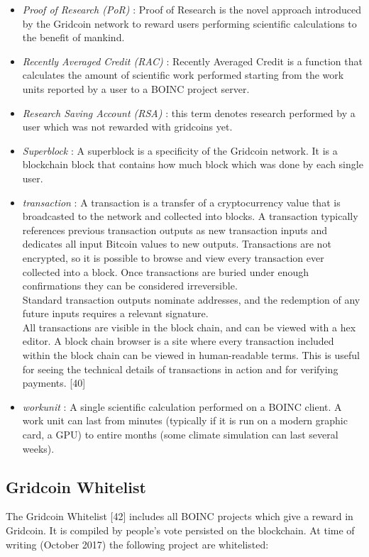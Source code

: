 \begin{itemize}
  \item \textit{Proof of Research (PoR)} : Proof of Research is the novel approach introduced by the Gridcoin network to reward users performing scientific calculations to the benefit of mankind.
  \item \textit{Recently Averaged Credit (RAC)} : Recently Averaged Credit is a function that calculates the amount of scientific work performed starting from the work units reported by a user to a BOINC project server.
  \item \textit{Research Saving Account (RSA)} : this term denotes research performed by a user which was not rewarded with gridcoins yet.
  \item \textit{Superblock} : A superblock is a specificity of the Gridcoin network. It is a blockchain block that contains how much block which was done by each single user.
  \item \textit{transaction} : A transaction is a transfer of a cryptocurrency value that is broadcasted to the network and collected into blocks. A transaction typically references previous transaction outputs as new transaction inputs and dedicates all input Bitcoin values to new outputs. Transactions are not encrypted, so it is possible to browse and view every transaction ever collected into a block. Once transactions are buried under enough confirmations they can be considered irreversible.\\
Standard transaction outputs nominate addresses, and the redemption of any future inputs requires a relevant signature.\\
All transactions are visible in the block chain, and can be viewed with a hex editor. A block chain browser is a site where every transaction included within the block chain can be viewed in human-readable terms. This is useful for seeing the technical details of transactions in action and for verifying payments. [40]
  \item \textit{workunit} : A single scientific calculation performed on a BOINC client. A work unit can last from minutes (typically if it is run on a modern graphic card, a GPU) 
to entire months (some climate simulation can last several weeks).
\end{itemize}

\subsection{Gridcoin Whitelist}

The Gridcoin Whitelist [42] includes all BOINC projects which give a reward in Gridcoin. It is compiled by people's vote persisted on the blockchain. At time of writing (October 2017) the following project are whitelisted:\\

